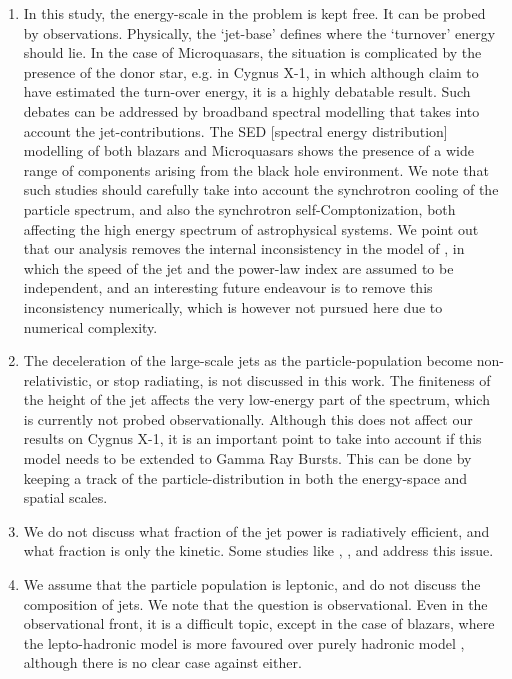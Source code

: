 \begin{enumerate}
\item In this study, the energy-scale in the problem is kept free. It can be probed by observations. Physically, the `jet-base' defines where the `turnover' energy should lie. In the case of Microquasars, the situation is complicated by the presence of the donor star, e.g. in Cygnus X-1, in which although \cite{Rahoui_et_al.-2011} claim to have estimated the turn-over energy, it is a highly debatable result. Such debates can be addressed by broadband spectral modelling that takes into account the jet-contributions. The SED [spectral energy distribution] modelling of both blazars \citep{Joshi_&_Bottcher-2007-ApJ, Paliya_et_al.-2015-ApJ} and Microquasars \citep{Zdziarski_et_al.-2014_b-MNRAS} shows the presence of a wide range of components arising from the black hole environment.  We note that such studies should carefully take into account the synchrotron cooling of the particle spectrum, and also the synchrotron self-Comptonization, both affecting the high energy spectrum of astrophysical systems. We point out that our analysis removes the internal inconsistency in the model of \citet{Zdziarski_et_al.-2014_a-MNRAS}, in which the speed of the jet and the power-law index are assumed to be independent, and an interesting future endeavour is to remove this inconsistency numerically, which is however not pursued here due to numerical complexity.

\item The deceleration of the large-scale jets as the particle-population become non-relativistic, or stop radiating, is not discussed in this work. The finiteness of the height of the jet affects the very low-energy part of the spectrum, which is currently not probed observationally. Although this does not affect our results on Cygnus X-1, it is an important point to take into account if this model needs to be extended to Gamma Ray Bursts. This can be done by keeping a track of the particle-distribution in both the energy-space and spatial scales.

\item We do not discuss what fraction of the jet power is radiatively efficient, and what fraction is only the kinetic. Some studies like \cite{Gallo_et_al.-2005-Nature}, \cite{Heinz-2006-ApJ}, and \cite{Malzac_Belmont_Fabian-2009-MNRAS} address this issue.

\item We assume that the particle population is leptonic, and do not discuss the composition of jets. We note that the question is observational. Even in the observational front, it is a difficult topic, except in the case of blazars, where the lepto-hadronic model \citep{Sahayanathan_&_Godambe-2012-MNRAS} is more favoured over purely hadronic model \citep{Paliya_et_al.-2016-arXiv}, although there is no clear case against either.


\end{enumerate}
